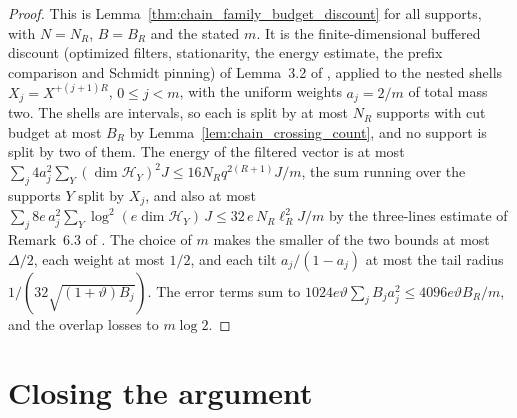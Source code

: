 \begin{proof}
    \leanok
    This is Lemma~\ref{thm:chain_family_budget_discount} for all supports, with
    $N=N_R$, $B=B_R$ and the stated $m$. It is the finite-dimensional buffered discount (optimized filters,
    stationarity, the energy estimate, the prefix comparison and Schmidt
    pinning) of Lemma~3.2 of \cite{OpenAI2026AreaLaw}, applied to the nested
    shells $X_j=X^{+(j+1)R}$, $0\le j<m$, with the uniform weights $a_j=2/m$ of
    total mass two. The shells are intervals, so each is split by at most $N_R$
    supports with cut budget at most $B_R$ by
    Lemma~\ref{lem:chain_crossing_count}, and no support is split by two of
    them. The energy of the filtered vector is at most
    $\sum_j4a_j^2\sum_Y(\dim\mathcal H_Y)^2J\le16N_Rq^{2(R+1)}J/m$, the sum
    running over the supports $Y$ split by $X_j$, and also at most
    $\sum_j8e\,a_j^2\sum_Y\log^2(e\dim\mathcal H_Y)\,J\le32\,e\,N_R\ell_R^2J/m$
    by the three-lines estimate of Remark~6.3 of
    \cite{TNLean2026OneDimensional}. The choice of $m$ makes the smaller of
    the two bounds at most $\Delta/2$, each weight at most $1/2$, and each tilt $a_j/(1-a_j)$ at most
    the tail radius $1/(32\sqrt{(1+\vartheta)B_j})$. The error terms sum to
    $1024e\vartheta\sum_jB_ja_j^2\le4096e\vartheta B_R/m$, and the overlap
    losses to $m\log2$.
    
\end{proof}

\section{Closing the argument}

